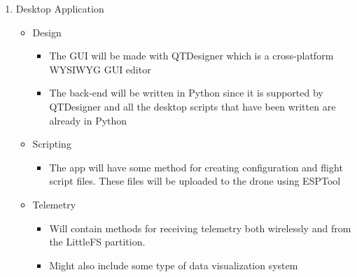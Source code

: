\documentclass[12pt, titlepage]{article}
\begin{document}
\begin{enumerate}
\begin{itemize}
\begin{itemize}
		\end{itemize}
		\item PID Flight Loop
		\begin{itemize}
			\item Most of this part will be taken from an existing drone project like ESP-Drone or BetaFlight
		\end{itemize}
	\end{itemize}
	\item Desktop Application
	\begin{itemize}
		\item Design
		\begin{itemize}
			\item The GUI will be made with QTDesigner which is a cross-platform WYSIWYG GUI editor
			\item The back-end will be written in Python since it is supported by QTDesigner and all the desktop scripts that have been written are already in Python 
		\end{itemize}
		\item Scripting
		\begin{itemize}
			\item The app will have some method for creating configuration and flight script files. These files will be uploaded to the drone using ESPTool
		\end{itemize}
		\item Telemetry
		\begin{itemize}
			\item Will contain methods for receiving telemetry both wirelessly and from the LittleFS partition. 
			\item Might also include some type of data visualization system
		\end{itemize}
	\end{itemize}
\end{enumerate}
\end{document}
